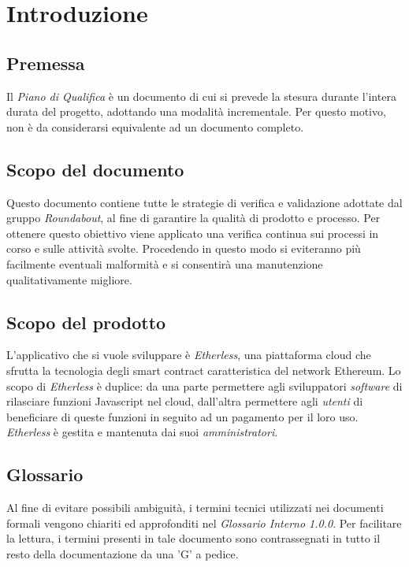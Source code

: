 \section{Introduzione}

\subsection{Premessa}
	Il \textit{Piano di Qualifica} è un documento di cui si prevede la stesura durante l'intera durata del progetto, adottando una modalità incrementale. Per questo motivo, non è da considerarsi equivalente ad un documento completo.


\subsection{Scopo del documento}
	Questo documento contiene tutte le strategie di verifica e validazione adottate dal gruppo \textit{Roundabout}, al fine di garantire la qualità di prodotto e processo. Per ottenere questo obiettivo viene applicato una verifica continua sui processi in corso e sulle attività svolte. Procedendo in questo modo si eviteranno più facilmente eventuali malformità e si consentirà una manutenzione qualitativamente migliore.


\subsection{Scopo del prodotto}
	L'applicativo che si vuole sviluppare è \textit{Etherless}, una piattaforma cloud che sfrutta la tecnologia
	degli smart contract caratteristica del network Ethereum. Lo scopo di \textit{Etherless} è duplice: da una
	parte permettere agli sviluppatori \textit{software} di rilasciare funzioni Javascript nel cloud, dall'altra
	permettere agli \textit{utenti} di beneficiare di queste funzioni in seguito ad un pagamento per il loro
	uso. \textit{Etherless} è gestita e mantenuta dai suoi \textit{amministratori}.


\subsection{Glossario}
	Al fine di evitare possibili ambiguità, i termini tecnici utilizzati nei documenti formali vengono
	chiariti ed approfonditi nel \textit{Glossario Interno 1.0.0}. Per facilitare la lettura, i termini presenti in
	tale documento sono contrassegnati in tutto il resto della documentazione da una 'G' a pedice.

